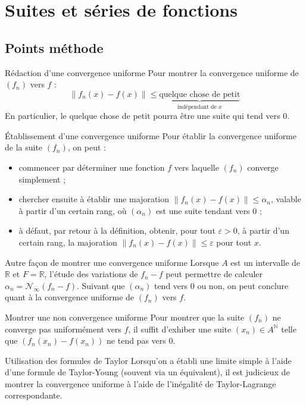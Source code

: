\documentclass[french]{book}
\newcommand{\N}{\mathbb{N}}
\newcommand{\R}{\mathbb{R}}
\theoremstyle{plain}
\theoremstyle{definition}
\theoremstyle{remark}
\begin{document}
\chapter{Suites et séries de fonctions}
\localtableofcontents
\section{Points méthode}
\begin{PM}{Rédaction d'une convergence uniforme} Pour montrer la convergence uniforme de $(f_n)$ vers $f$ : $$\lVert f_n(x)-f(x)\rVert\leqslant\underbrace{\text{quelque chose de petit}}_{\text{indépendant de }x}$$ En particulier, le quelque chose de petit pourra être une suite qui tend vers $0$.
\end{PM}
\begin{PM}{Établissement d'une convergence uniforme} Pour établir la convergence uniforme de la suite $(f_n)$, on peut :
\begin{itemize}
	\item commencer par déterminer une fonction $f$ vers laquelle $(f_n)$ converge simplement ;
	\item chercher ensuite à établir une majoration $\lVert f_n(x)-f(x)\rVert\leqslant \alpha_n$, valable à partir d'un certain rang, où $(\alpha_n)$ est une suite tendant vers $0$ ;
	\item à défaut, par retour à la définition, obtenir, pour tout $\varepsilon>0$, à partir d'un certain rang, la majoration $\lVert f_n(x)-f(x)\rVert\leqslant\varepsilon$ pour tout $x$.
\end{itemize}
\end{PM}
\begin{PM}{Autre façon de montrer une convergence uniforme} Lorsque $A$ est un intervalle de $\R$ et $F=\R$, l'étude des variations de $f_n-f$ peut permettre de calculer $\alpha_n=\mathcal{N}_\infty(f_n-f)$. Suivant que $(\alpha_n)$ tend vers $0$ ou non, on peut conclure quant à la convergence uniforme de $(f_n)$ vers $f$.
\end{PM}
\begin{PM}{Montrer une non convergence uniforme} Pour montrer que la suite $(f_n)$ ne converge pas uniformément vers $f$, il suffit d'exhiber une suite $(x_n)\in A^\N$ telle que $(f_n(x_n)-f(x_n))$ ne tend pas vers $0$.
\end{PM}
\begin{PM}{Utilisation des formules de Taylor} Lorsqu'on a établi une limite simple à l'aide d'une formule de Taylor-Young (souvent via un équivalent), il est judicieux de montrer la convergence uniforme à l'aide de l'inégalité de Taylor-Lagrange correspondante.
\end{PM}
\end{document}
